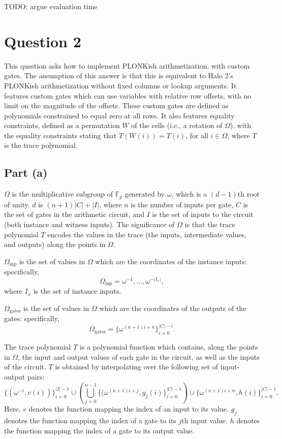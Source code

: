 \documentclass[11pt]{article}
\begin{document}
TODO: argue evaluation time

\section{Question 2}

This question asks how to implement PLONKish arithmetization, with custom gates. The assumption of this
answer is that this is equivalent to Halo 2's PLONKish arithmetization without fixed columns or
lookup arguments. It features custom gates which can use variables with relative row offsets, with
no limit on the magnitude of the offsets. These custom gates are defined as polynomials constrained to equal
zero at all rows. It also features equality constraints, defined as a permutation $W$ of the cells (i.e.,
a rotation of $\Omega$), with the equality constraints stating that $T(W(i)) = T(i)$, for all $i \in \Omega$,
where $T$ is the trace polynomial.

\subsection{Part (a)}

$\Omega$ is the multiplicative subgroup of $\mathbb{F}_p$ generated by $\omega$, which is a $(d-1)$th root of unity.
$d$ is $(n+1)|C| + |I|$, where $n$ is the number of inputs per gate, $C$ is the set of gates in
the arithmetic circuit, and $I$ is the set of inputs
to the circuit (both instance and witness inputs). The significance of $\Omega$ is that the trace polynomial
$T$ encodes the values in the trace (the inputs, intermediate values, and outputs) along the points in $\Omega$.

$\Omega_{\text{inp}}$ is the set of values in $\Omega$ which are the coordinates of the instance inputs: specifically,
\begin{equation}
	\Omega_{\text{inp}} = \omega^{-1}, ..., \omega^{-|I_x|},
\end{equation}
where $I_x$ is the set of instance inputs.

$\Omega_{\text{gates}}$ is the set of values in $\Omega$ which are the coordinates of the outputs of the gates:
specifically,
\begin{equation}
	\Omega_{\text{gates}} = \{\omega^{(n+1)i+n}\}_{i=0}^{|C|-i}.
\end{equation}

The trace polynomial $T$ is a polynomial function which contains, along the points in $\Omega$, the input and
output values of each gate in the circuit, as well as the inputs of the circuit. $T$ is obtained by
interpolating over the following set of input-output pairs:
\begin{equation}
	\{(\omega^{-i}, v(i))\}_{i=0}^{|I|-1} \cup \left( \bigcup_{j=0}^{n-1} \{(\omega^{(n+1)i+j}, g_j(i)\}_{i=0}^{|C|-1} \right )
	\cup \{\omega^{(n+1)i+n}, h(i)\}_{i=0}^{|C|-1}.
\end{equation}
Here, $v$ denotes the function mapping the index of an input to its value. $g_j$ denotes the function mapping the
index of a gate to its $j$th input value. $h$ denotes the function mapping the index of a gate to its output value.
\end{document}
